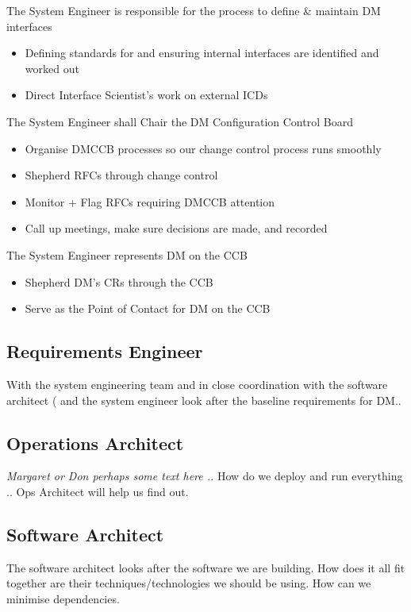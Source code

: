 The System Engineer is responsible for the process to define \& maintain DM interfaces
\begin{itemize}
\item Defining standards for and ensuring internal interfaces are identified and worked out
\item Direct Interface Scientist's work on external ICDs
\end{itemize}

The System Engineer shall Chair the DM Configuration Control Board 
\begin{itemize}
\item Organise DMCCB  processes so our change control process runs smoothly
\item Shepherd RFCs through change control
\item Monitor + Flag RFCs requiring DMCCB  attention
\item Call up meetings, make sure decisions are made, and recorded
\end{itemize}

The System Engineer represents DM on the CCB
\begin{itemize}
\item Shepherd DM’s CRs through the CCB
\item Serve as the Point of Contact for DM on the CCB
\end{itemize}

\subsection{Requirements Engineer \label{role:reqeng}}
With the system engineering team  and in close coordination with the software architect ( and the system engineer  look after the baseline requirements for DM.. 


\subsection{Operations Architect \label{role:opsarc}}
{\em Margaret  or Don perhaps some text here .. }
How do we deploy and run everything .. Ops Architect will help us find out. 


\subsection{Software Architect \label{role:softarc}}
The software architect looks after the software we are building. How does it all fit together are their techniques/technologies we should be using. How can we minimise dependencies. 

